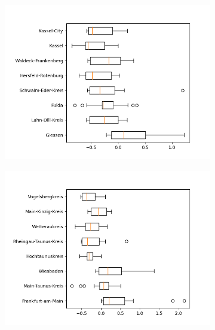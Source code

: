 \begin{figure}
	\centering
	\begin{subfigure}[b]{0.4\textwidth}
		\centering
		\includegraphics[width=\textwidth]{./figures/deviation_box_alt1.png}	
	\end{subfigure}
	\begin{subfigure}[b]{0.4\textwidth}
		\centering
		\includegraphics[width=\textwidth]{./figures/deviation_box_alt2.png}	
	\end{subfigure}
	\begin{subfigure}[b]{0.4\textwidth}
		\centering

\end{subfigure}
\end{figure}
